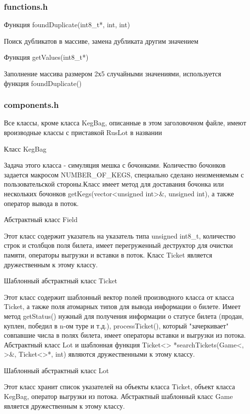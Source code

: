 \documentclass[a4paper,14pt]{article}
\begin{document}
\subsubsection{functions.h}
\begin{center}
   Функция foundDuplicate(int8\_t*, int, int)
\end{center}
Поиск дубликатов в массиве, замена дубликата другим значением
\begin{center}
   Функция getValues(int8\_t*)
\end{center}
Заполнение массива размером 2х5 случайными значениями, используется функция foundDuplicate()
\subsubsection{components.h}
Все классы, кроме класса KegBag, описанные в этом заголовочном файле, имеют вроизводные классы с приставкой RusLot в названии
\begin{center}
   Класс KegBag
\end{center}
Задача этого класса - симуляция мешка с бочонками. Количество бочонков задается макросом NUMBER\_OF\_KEGS, специально сделано неизменяемым с пользовательской стороны.Класс имеет метод для доставания бочонка или нескольких бочонков getKegs(vector<unsigned int>&, unsigned int), а также оператор вывода в поток.
\begin{center}
   Абстрактный класс Field
\end{center}
Этот класс содержит указатель на указатель типа unsigned int8\_t, количество строк и столбцов поля билета, имеет перегруженный деструктор для очистки памяти, операторы выгрузки и вставки в поток. Класс Ticket является дружественным к этому классу.
\begin{center}
   Шаблонный абстрактный класс Ticket
\end{center}
Этот класс содержит шаблонный вектор полей производного класса от класса Ticket, а также поля атомарных типов для вывода информации о билете. Имеет метод getStatus() нужный для получения информации о статусе билета (продан, куплен, победил в n-ом туре и т.д.), processTicket(), который "зачеркивает" совпавшие числа в полях билета, имеет операторы вставки и выгрузки из потока. Абстрактный класс Lot и шаблонная функция Ticket<> *searchTickets(Game<, >&, Ticket<>*, int) являются дружественными к этому классу.
\begin{center}
   Шаблонный абстрактный класс Lot
\end{center}
Этот класс хранит список указателей на объекты класса Ticket, объект класса KegBag, оператор выгрузки из потока. Абстрактный шаблонный класс Game является дружественным к этому классу.
\end{document}
